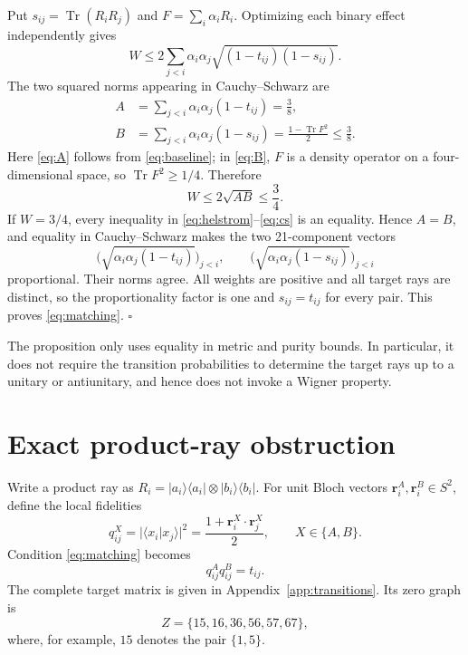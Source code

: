 \documentclass[11pt]{article}
\newcommand{\Tr}{\operatorname{Tr}}
\newcommand{\ket}[1]{\lvert #1\rangle}
\newcommand{\bra}[1]{\langle #1\rvert}
\newcommand{\proj}[1]{\ket{#1}\!\bra{#1}}
\begin{document}
Put $s_{ij}=\Tr(R_iR_j)$ and $F=\sum_i\alpha_iR_i$.  Optimizing each binary
effect independently gives
\begin{equation}
 W\leq2\sum_{j<i}\alpha_i\alpha_j
       \sqrt{(1-t_{ij})(1-s_{ij})}.                      \label{eq:helstrom}
\end{equation}
The two squared norms appearing in Cauchy--Schwarz are
\begin{align}
 A&=\sum_{j<i}\alpha_i\alpha_j(1-t_{ij})=\frac38,
                                                               \label{eq:A}\\
 B&=\sum_{j<i}\alpha_i\alpha_j(1-s_{ij})
   =\frac{1-\Tr F^2}{2}\leq\frac38.                    \label{eq:B}
\end{align}
Here \eqref{eq:A} follows from \eqref{eq:baseline}; in
\eqref{eq:B}, $F$ is a density operator on a four-dimensional space, so
$\Tr F^2\geq1/4$.  Therefore
\begin{equation}
  W\leq2\sqrt{AB}\leq\frac34.                            \label{eq:cs}
\end{equation}
If $W=3/4$, every inequality in \eqref{eq:helstrom}--\eqref{eq:cs} is an
equality.  Hence $A=B$, and equality in Cauchy--Schwarz makes the two
21-component vectors
\begin{equation}
 \bigl(\sqrt{\alpha_i\alpha_j(1-t_{ij})}\bigr)_{j<i},
 \qquad
 \bigl(\sqrt{\alpha_i\alpha_j(1-s_{ij})}\bigr)_{j<i}
\end{equation}
proportional.  Their norms agree.  All weights are positive and all target
rays are distinct, so the proportionality factor is one and
$s_{ij}=t_{ij}$ for every pair.  This proves \eqref{eq:matching}.
\hfill$\square$

The proposition only uses equality in metric and purity bounds.  In
particular, it does not require the transition probabilities to determine the
target rays up to a unitary or antiunitary, and hence does not invoke a Wigner
property.

\section{Exact product-ray obstruction}
\label{sec:obstruction}

Write a product ray as
$R_i=\proj{a_i}\otimes\proj{b_i}$.  For unit Bloch vectors
$\boldsymbol r_i^A,\boldsymbol r_i^B\in S^2$, define the local fidelities
\begin{equation}
 q_{ij}^X=\lvert\langle x_i|x_j\rangle\rvert^2
 =\frac{1+\boldsymbol r_i^X\!\cdot\boldsymbol r_j^X}{2},
 \qquad X\in\{A,B\}.                                    \label{eq:q}
\end{equation}
Condition \eqref{eq:matching} becomes
\begin{equation}
 q_{ij}^Aq_{ij}^B=t_{ij}.                                \label{eq:factor}
\end{equation}
The complete target matrix is given in Appendix~\ref{app:transitions}.  Its
zero graph is
\begin{equation}
 Z=\{15,16,36,56,57,67\},                                \label{eq:zeros}
\end{equation}
where, for example, $15$ denotes the pair $\{1,5\}$.
\end{document}

